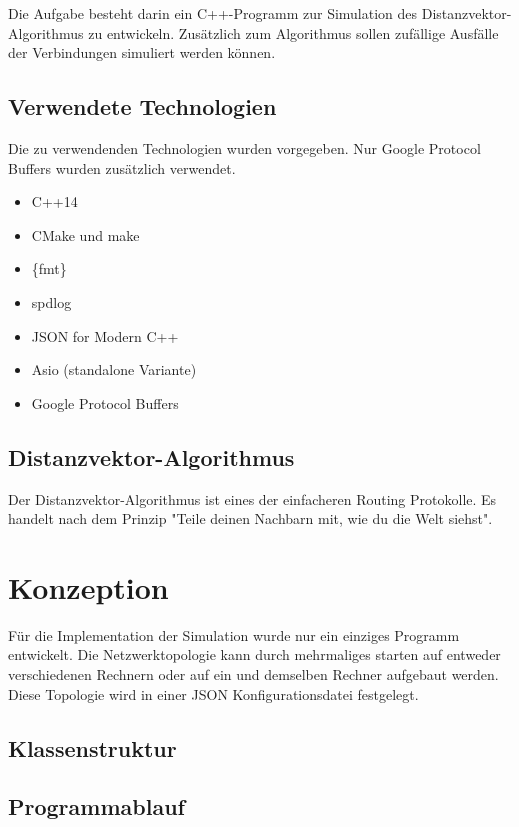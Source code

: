 \documentclass[a4paper,ngerman]{article}
\begin{document}
Die Aufgabe besteht darin ein C++-Programm zur Simulation des Distanzvektor-Algorithmus zu entwickeln. Zusätzlich zum Algorithmus sollen zufällige Ausfälle der Verbindungen simuliert werden können.

\subsection{Verwendete Technologien}

Die zu verwendenden Technologien wurden vorgegeben. Nur Google Protocol Buffers wurden zusätzlich verwendet.

\begin{itemize}
    \item C++14
    \item CMake und make
    \item \{fmt\}
    \item spdlog
    \item JSON for Modern C++
    \item Asio (standalone Variante)
    \item Google Protocol Buffers
\end{itemize}

\subsection{Distanzvektor-Algorithmus}

Der Distanzvektor-Algorithmus ist eines der einfacheren Routing Protokolle. Es handelt nach dem Prinzip "Teile deinen Nachbarn mit, wie du die Welt siehst".

\section{Konzeption}

Für die Implementation der Simulation wurde nur ein einziges Programm entwickelt. Die Netzwerktopologie kann durch mehrmaliges starten auf entweder verschiedenen Rechnern oder auf ein und demselben Rechner aufgebaut werden. Diese Topologie wird in einer JSON Konfigurationsdatei festgelegt.

\subsection{Klassenstruktur}


\subsection{Programmablauf}
\end{document}
